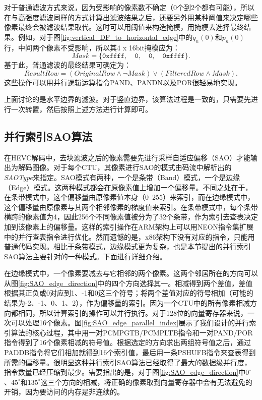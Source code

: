 对于普通滤波方式来说，因为受影响的像素数不确定（0个到2个都有可能），所以在与高强度滤波同样的方式计算出滤波结果之后，还要另外用某种阈值来决定哪些像素最终会被滤波结果取代。这时可以用阈值来构造掩模，用掩模去选择最终结果。例如，对于图\ref{fig:vertical_DF_to_horizontal_edge}中的$q_n(0)$和$p_n(0)$行，中间两个像素不受影响，所以其4 x 16bit掩模应为：
\begin{equation}
Mask = \{ \texttt{0xffff}, \quad \texttt{0}, \quad \texttt{0}, \quad \texttt{0xffff} \}.
\end{equation}
基于此，普通滤波的最终结果可确定为：
\begin{equation}
ResultRow = (OriginalRow \land \neg Mask ) \lor (FilteredRow \land Mask).
\end{equation}
这些操作可以用并行逻辑运算指令PAND、PANDN以及POR很轻易地实现。

上面讨论的是水平边界的滤波。对于竖直边界，该算法过程是一致的，只需要先进行一次转置，然后按照上述方法进行计算即可。

\subsection{并行索引SAO算法}

在HEVC解码中，去块滤波之后的像素需要先进行采样自适应偏移（SAO）才能输出为解码图像。对于每个CTU，其像素进行SAO的模式由码流中解析出的\textit{SAOType}来指定。SAO模式有两种，一个是条带（Band）模式，一个是边缘（Edge）模式。这两种模式都会在原像素值上增加一个偏移量。不同之处在于，在条带模式中，这个偏移量由原像素值本身（0~255）来索引，而在边缘模式中，这个偏移量由原像素与其两个相邻像素的梯度值来索引。在条带模式中，每个条带横跨的像素值为4，因此256个不同像素值被分为了32个条带，作为索引去查表决定加到该像素上的偏移量。这样的索引操作在ARM架构上可以用NEON指令集扩展中的并行查表指令进行优化。然而遗憾的是，x86架构下没有对应的指令，只能用普通代码实现。相比于条带模式，边缘模式更为复杂，也是本节提出的并行索引SAO算法主要针对的一种模式。下面进行详细介绍。

在边缘模式中，一个像素要减去与它相邻的两个像素。这两个邻居所在的方向可以从图\ref{fig:SAO_edge_direction}中的四个方向选择其一。相减得到两个差值，差值根据其正负或0对应到1、-1和0这三个符号；将两个差值对应的符号相加（可能的结果为-2、-1、0、1、2），作为偏移量的索引。因为一个CTU中的所有像素相减方向都相同，所以计算索引的操作可以并行执行。对于128位的向量寄存器来说，一次可以处理16个像素。图\ref{fig:SAO_edge_parallel_index}展示了我们设计的并行索引算法的核心过程，其中用一对PCMPGTB/PCMPLTB指令和一对PAND/POR指令得到了16个像素相减的符号值。根据选定的方向求出两组符号值之后，通过PADDB指令将它们相加就得到16个索引值，最后用一条PSHUFB指令来查表得到所需的偏移量。很明显这种并行索引SAO算法已经取得了最大的数据级并行度，指令数量已经压缩到最少。需要指出的是，对于图\ref{fig:SAO_edge_direction}中$0^\circ$、$45^\circ$和$135^\circ$这三个方向的相减，将正确的像素取到向量寄存器中会有无法避免的开销，因为要访问的内存是非连续的。

